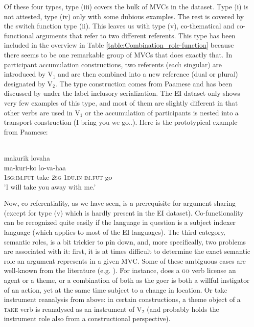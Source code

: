 Of these four types, type (iii) covers the bulk of MVCs in the dataset. Type (i) is not attested, type (iv) only with some dubious examples. The rest is covered by the switch function type (ii). This leaves us with type (v), co-thematical and co-functional arguments that refer to two different referents. This type has been included in the overview in Table \ref{table:Combination_role-function} because there seems to be one remarkable group of MVCs that does exactly that. In participant accumulation constructions, two referents (each singular) are introduced by V$_1$ and are then combined into a new reference (dual or plural) designated by V$_2$. The type construction comes from Paamese and has been discussed by \citet[41]{crowley2002serial} under the label inclusory serialization. The EI dataset only shows very few examples of this type, and most of them are slightly different in that other verbs are used in V$_1$ or the accumulation of participants is nested into a transport construction (I bring you we go..). Here is the prototypical example from Paamese:

\ea \label{paamese003}
\\
\glll makurik lovaha \\
ma-kuri-ko lo-va-haa \\
1\textsc{sg}:\textsc{im}.\textsc{fut}-take-2\textsc{sg} 1\textsc{du}.\textsc{in}-\textsc{im}.\textsc{fut}-go \\
\glft 'I will take you away with me.'\\ 
\z

Now, co-referentiality, as we have seen, is a prerequisite for argument sharing (except for type (v) which is hardly present in the EI dataset). Co-functionality can be recognized quite easily if the language in question is a subject indexer language (which applies to most of the EI languages). The third category, semantic roles, is a bit trickier to pin down, and, more specifically, two problems are associated with it: first, it is at times difficult to determine the exact semantic role an argument represents in a given MVC. Some of these ambiguous cases are well-known from the literature (e.g. \citealt{Dowty1979, Jackendoff1990, van1997syntax}). For instance, does a \textsc{go} verb license an agent or a theme, or a combination of both as the goer is both a willful instigator of an action, yet at the same time subject to a change in location. Or take instrument reanalysis from above: in certain constructions, a theme object of a \textsc{take} verb is reanalysed as an instrument of V$_2$ (and probably holds the instrument role also from a constructional perspective). 

